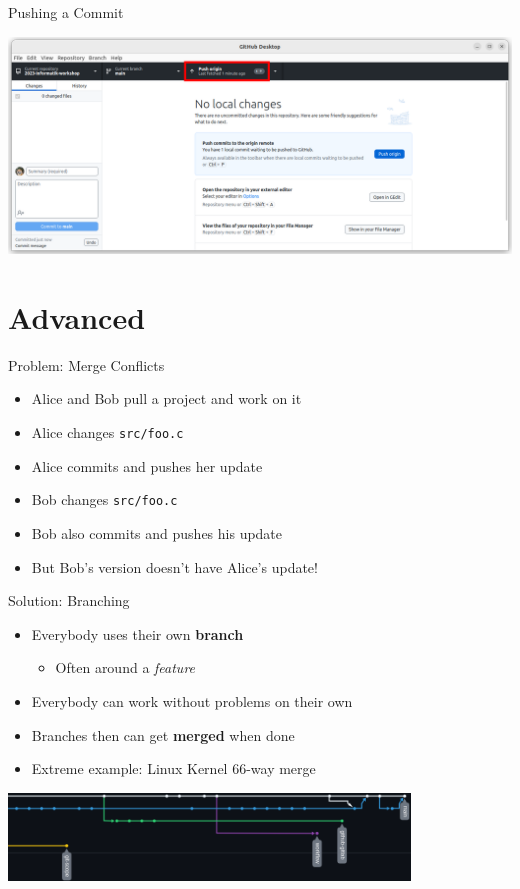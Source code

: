 \documentclass[compress,aspectratio=169]{beamer}
\begin{document}
  \begin{frame}{Pushing a Commit}
    \begin{center}
      \includegraphics[height=0.75\textheight]{./assets/GH_03.png}
    \end{center}
  \end{frame}

	\section{Advanced}

	\begin{frame}{Problem: Merge Conflicts}
		\begin{itemize}
			\item Alice and Bob pull a project and work on it
      \item Alice changes \texttt{src/foo.c}
      \item Alice commits and pushes her update
      \item Bob changes \texttt{src/foo.c}
      \item Bob also commits and pushes his update
      \item But Bob's version doesn't have Alice's update!
		\end{itemize}
	\end{frame}

  \begin{frame}{Solution: Branching}
    \begin{itemize}
      \item Everybody uses their own \textbf{branch}
        \begin{itemize}
          \item Often around a \emph{feature}
        \end{itemize}
      \item Everybody can work without problems on their own
      \item Branches then can get \textbf{merged} when done
      \item Extreme example: Linux Kernel 66-way merge
    \end{itemize}
    \begin{center}
      \includegraphics[width=0.8\textwidth]{./assets/guitarhero.png}
    \end{center}
  \end{frame}
\end{document}
